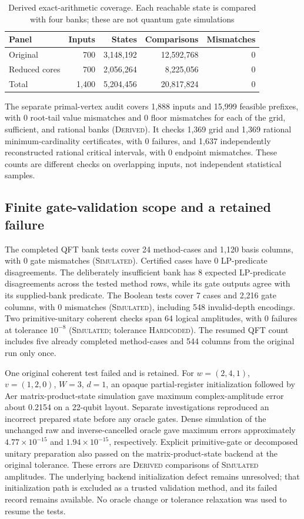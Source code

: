 \documentclass[referee,pdflatex,sn-mathphys-num]{sn-jnl}
\theoremstyle{thmstyleone}
\theoremstyle{thmstyletwo}
\begin{document}
\begin{table}[t]
\caption{Derived exact-arithmetic coverage. Each reachable state is compared with four banks; these are not quantum gate simulations}\label{tab:coverage}
\centering\small
\begin{tabular}{lrrrr}
\toprule
Panel & Inputs & States & Comparisons & Mismatches\\
\midrule
Original & 700 & 3,148,192 & 12,592,768 & 0\\
Reduced cores & 700 & 2,056,264 & 8,225,056 & 0\\
Total & 1,400 & 5,204,456 & 20,817,824 & 0\\
\bottomrule
\end{tabular}
\end{table}

The separate primal-vertex audit covers 1,888 inputs and 15,999 feasible prefixes, with 0 root-tail value mismatches and 0 floor mismatches for each of the grid, sufficient, and rational banks (\textsc{Derived}). It checks 1,369 grid and 1,369 rational minimum-cardinality certificates, with 0 failures, and 1,637 independently reconstructed rational critical intervals, with 0 endpoint mismatches. These counts are different checks on overlapping inputs, not independent statistical samples.

\subsection{Finite gate-validation scope and a retained failure}
The completed QFT bank tests cover 24 method-cases and 1,120 basis columns, with 0 gate mismatches (\textsc{Simulated}). Certified cases have 0 LP-predicate disagreements. The deliberately insufficient bank has 8 expected LP-predicate disagreements across the tested method rows, while its gate outputs agree with its supplied-bank predicate. The Boolean tests cover 7 cases and 2,216 gate columns, with 0 mismatches (\textsc{Simulated}), including 548 invalid-depth encodings. Two primitive-unitary coherent checks span 64 logical amplitudes, with 0 failures at tolerance $10^{-8}$ (\textsc{Simulated}; tolerance \textsc{Hardcoded}). The resumed QFT count includes five already completed method-cases and 544 columns from the original run only once.

One original coherent test failed and is retained. For $w=(2,4,1)$, $v=(1,2,0)$, $W=3$, $d=1$, an opaque partial-register initialization followed by Aer matrix-product-state simulation gave maximum complex-amplitude error about 0.2154 on a 22-qubit layout. Separate investigations reproduced an incorrect prepared state before any oracle gates. Dense simulation of the unchanged raw and inverse-cancelled oracle gave maximum errors approximately $4.77\times10^{-15}$ and $1.94\times10^{-15}$, respectively. Explicit primitive-gate or decomposed unitary preparation also passed on the matrix-product-state backend at the original tolerance. These errors are \textsc{Derived} comparisons of \textsc{Simulated} amplitudes. The underlying backend initialization defect remains unresolved; that initialization path is excluded as a trusted validation method, and its failed record remains available. No oracle change or tolerance relaxation was used to resume the tests.
\end{document}
